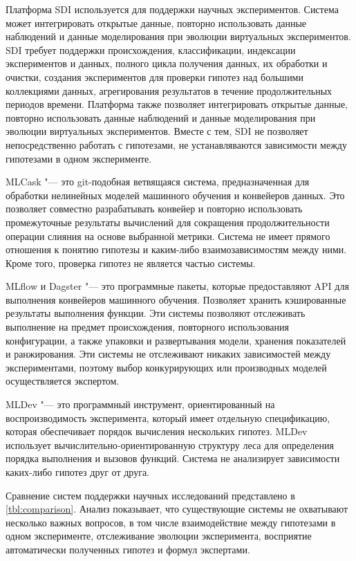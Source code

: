 Платформа SDI \cite{demchenko2013addressing}  используется для поддержки научных экспериментов. Система может 
интегрировать открытые данные, повторно использовать данные наблюдений и данные моделирования при эволюции виртуальных 
экспериментов. SDI требует поддержки происхождения, классификации, индексации экспериментов и данных, полного цикла 
получения данных, их обработки и очистки, создания экспериментов для проверки гипотез над большими коллекциями данных, 
агрегирования результатов в течение продолжительных периодов времени. Платформа также позволяет интегрировать открытые 
данные, повторно использовать данные наблюдений и данные моделирования при эволюции виртуальных экспериментов. 
Вместе с тем, SDI не позволяет непосредственно работать с гипотезами, не устанавляваются зависимости между гипотезами 
в одном эксперименте.

MLCask \cite{Luo2021} "--- это git-подобная ветвящаяся система, предназначенная для обработки нелинейных моделей 
машинного обучения и конвейеров данных. Это позволяет совместно разрабатывать конвейер и повторно использовать 
промежуточные результаты вычислений для сокращения продолжительности операции слияния на основе выбранной метрики. 
Система не имеет прямого отношения к понятию гипотезы и каким-либо взаимозависимостям между ними. Кроме того, проверка 
гипотез не является частью системы.

MLflow \cite{Zaharia2018} и Dagster \cite{Dagster2022} "--- это программные пакеты, которые предоставляют API для 
выполнения конвейеров машинного обучения. Позволяет хранить кэшированные результаты выполнения функции. Эти системы 
позволяют отслеживать выполнение на предмет происхождения, повторного использования конфигурации, а также упаковки и 
развертывания модели, хранения показателей и ранжирования. Эти системы не отслеживают никаких зависимостей между 
экспериментами, поэтому выбор конкурирующих или производных моделей осуществляется экспертом.

MLDev \cite{Khritankov2022} "--- это программный инструмент, ориентированный на воспроизводимость эксперимента, 
который имеет отдельную спецификацию, которая обеспечивает порядок вычисления нескольких гипотез. MLDev использует 
вычислительно-ориентированную структуру леса для определения порядка выполнения и вызовов функций. Система не 
анализирует зависимости каких-либо гипотез друг от друга.

Сравнение систем поддержки научных исследований представлено в \cref{tbl:comparison}. Анализ показывает, 
что существующие системы не охватывают несколько важных вопросов, в том числе взаимодействие между гипотезами в 
одном эксперименте, отслеживание эволюции эксперимента, восприятие автоматически полученных гипотез и формул экспертами.

